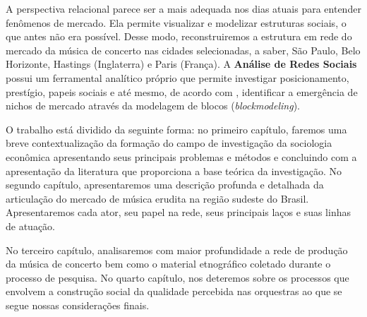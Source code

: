 \documentclass[a4paper, 12pt, openright, oneside, german, french, english, brazil]{abntex2}
\begin{document}
	A perspectiva relacional parece ser a mais adequada nos dias atuais para entender fenômenos de mercado. Ela permite visualizar e modelizar estruturas sociais, o que antes não era possível. Desse modo, reconstruiremos a estrutura em rede do mercado da música de concerto nas cidades selecionadas, a saber, São Paulo, Belo Horizonte, Hastings (Inglaterra) e Paris (França). A \textbf{Análise de Redes Sociais} possui um ferramental analítico próprio que permite investigar posicionamento, prestígio, papeis sociais e até mesmo, de acordo com , identificar a emergência de nichos de mercado através da modelagem de blocos (\textit{blockmodeling}).
	
	
	
	
	
	
	
	
	
	O trabalho está dividido da seguinte forma: no primeiro capítulo, faremos uma breve contextualização da formação do campo de investigação da sociologia econômica apresentando seus principais problemas e métodos e concluindo com a apresentação da literatura que proporciona a base teórica da investigação. No segundo capítulo, apresentaremos uma descrição profunda e detalhada da articulação do mercado de música erudita na região sudeste do Brasil. Apresentaremos cada ator, seu papel na rede, seus principais laços e suas linhas de atuação.
	
	No terceiro capítulo, analisaremos com maior profundidade a rede de produção da música de concerto bem como o material etnográfico coletado durante o processo de pesquisa. No quarto capítulo, nos deteremos sobre os processos que envolvem a construção social da qualidade percebida nas orquestras ao que se segue nossas considerações finais.
	
	
\end{document}
